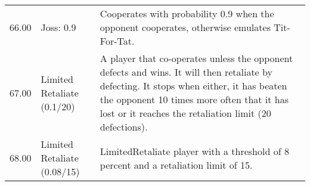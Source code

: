 \begin{table}[!hbtp]
\begin{adjustbox}{width=2\textwidth, angle=90}
\begin{tabular}{rll}
	66.00  & Joss: 0.9                   & Cooperates with probability 0.9 when the opponent cooperates, otherwise
	emulates Tit-For-Tat.                                                                                                                                                                                                                                                                                                                                                                                                                                                                                                                                                                                                                                                                                                                                                                                                                                                                                                                        \\
	67.00  & Limited Retaliate (0.1/20)  & A player that co-operates unless the opponent defects and wins.
	It will then retaliate by defecting. It stops when either, it has beaten
	the opponent 10 times more often that it has lost or it reaches the
	retaliation limit (20 defections).                                                                                                                                                                                                                                                                                                                                                                                                                                                                                                                                                                                                                                                                                                                                                              \\
	68.00  & Limited Retaliate (0.08/15) & LimitedRetaliate player with a threshold of 8 percent and a
	retaliation limit of 15.                                                                                                                                                                                                                                                                                                                                                                                                                                                                                                                                                                                                                                                                                                                                                                                                                                                                                                                                 \\

\end{tabular}
\end{adjustbox}
\end{table}
